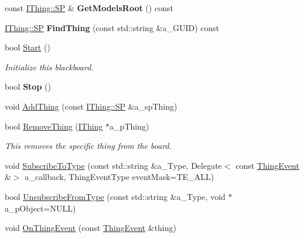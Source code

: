 \begin{DoxyCompactItemize}
const \hyperlink{class_i_thing_a6e95654aef6362c48b9a2fd44a1f970a}{I\+Thing\+::\+SP} \& {\bfseries Get\+Models\+Root} () const
\item 
\mbox{\label{class_black_board_aa54d6d7a39e067e0091e0358951b598b}} 
\hyperlink{class_i_thing_a6e95654aef6362c48b9a2fd44a1f970a}{I\+Thing\+::\+SP} {\bfseries Find\+Thing} (const std\+::string \&a\+\_\+\+G\+U\+ID) const
\item 
\mbox{\label{class_black_board_adb449e10fc27b8f50dc3b00c63a188c2}} 
bool \hyperlink{class_black_board_adb449e10fc27b8f50dc3b00c63a188c2}{Start} ()
\begin{DoxyCompactList}\small\item\em Initialize this blackboard. \end{DoxyCompactList}\item 
\mbox{\label{class_black_board_ab1f9089fcea4cb6739401df5d72301cc}} 
bool {\bfseries Stop} ()
\item 
void \hyperlink{class_black_board_ae5c15e743e9abd413c1711a3091b6da8}{Add\+Thing} (const \hyperlink{class_i_thing_a6e95654aef6362c48b9a2fd44a1f970a}{I\+Thing\+::\+SP} \&a\+\_\+sp\+Thing)
\item 
\mbox{\label{class_black_board_a64c506b6e6a6eaaeac52c03ecfe6b4a5}} 
bool \hyperlink{class_black_board_a64c506b6e6a6eaaeac52c03ecfe6b4a5}{Remove\+Thing} (\hyperlink{class_i_thing}{I\+Thing} $\ast$a\+\_\+p\+Thing)
\begin{DoxyCompactList}\small\item\em This removes the specific thing from the board. \end{DoxyCompactList}\item 
void \hyperlink{class_black_board_a6e3a81af31e182047d78adf2131f8d09}{Subscribe\+To\+Type} (const std\+::string \&a\+\_\+\+Type, Delegate$<$ const \hyperlink{class_thing_event}{Thing\+Event} \&$>$ a\+\_\+callback, Thing\+Event\+Type event\+Mask=T\+E\+\_\+\+A\+LL)
\item 
bool \hyperlink{class_black_board_a743f02f77a5d7008b510459dbcac69d6}{Unsubscribe\+From\+Type} (const std\+::string \&a\+\_\+\+Type, void $\ast$a\+\_\+p\+Object=N\+U\+LL)
\item 
void \hyperlink{class_black_board_a64acc3b0a151c7124341ec4b67b2a23c}{On\+Thing\+Event} (const \hyperlink{class_thing_event}{Thing\+Event} \&thing)

\end{DoxyCompactItemize}
